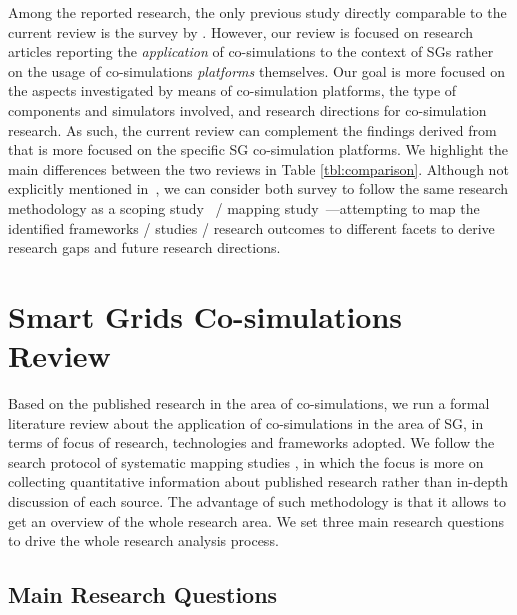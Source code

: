 \documentclass[1p]{elsarticle} %
\begin{document}
Among the reported research, the only previous study directly comparable to the current review is the survey by \citet{ref:vogt2018survey}. However, our review is focused on research articles reporting the \textit{application} of co-simulations to the context of SGs rather on the usage of co-simulations \textit{platforms} themselves. Our goal is more focused on the aspects investigated by means of co-simulation platforms, the type of components and simulators involved, and research directions for co-simulation research.
As such, the current review can complement the findings derived from~\citet{ref:vogt2018survey} that is more focused on the specific SG co-simulation platforms. We highlight the main differences between the two reviews in Table \ref{tbl:comparison}. Although not explicitly mentioned in~\citet{ref:vogt2018survey}, we can consider both survey to follow the same research methodology as a scoping study~\citep{ref:arksey2005-scoping} / mapping study~\citep{ref:petersen2008systematic,ref:barn2017conductingsms}---attempting to map the identified frameworks / studies / research outcomes to different facets to derive research gaps and future research directions.


\section{Smart Grids Co-simulations Review}\label{survey-sg-cosimulations}

Based on the published research in the area of co-simulations, we run a formal literature review about the application of co-simulations in the area of SG, in terms of focus of research, technologies and frameworks adopted. We follow the search protocol of systematic mapping studies \citep{ref:petersen2008systematic,ref:barn2017conductingsms}, in which the focus is more on collecting quantitative information about published research rather than in-depth discussion of each source. The advantage of such methodology is that it allows to get an overview of the whole research area.
We set three main research questions to drive the whole research analysis process.

\subsection{Main Research Questions}
\end{document}
